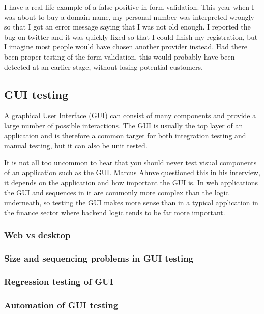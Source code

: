 \documentclass[11pt]{article}
\begin{document}
I have a real life example of a false positive in form validation. This year when I was about to buy a domain name, my personal number was interpreted wrongly so that I got an error message saying that I was not old enough. I reported the bug on twitter and it was quickly fixed so that I could finish my registration, but I imagine most people would have chosen another provider instead. Had there been proper testing of the form validation, this would probably have been detected at an earlier stage, without losing potential customers. \cite{TwitterMe}

\subsection{GUI testing}

A graphical User Interface (GUI) can consist of many components and provide a large number of possible interactions. The GUI is usually the top layer of an application and is therefore a common target for both integration testing and manual testing, but it can also be unit tested.

It is not all too uncommon to hear that you should never test visual components of an application such as the GUI. Marcus Ahnve questioned this in his interview, it depends on the application and how important the GUI is. In web applications the GUI and sequences in it are commonly more complex than the logic underneath, so testing the GUI makes more sense than in a typical application in the finance sector where backend logic tends to be far more important. \cite[question~21]{Ahnve}

\subsubsection{Web vs desktop}

\subsubsection{Size and sequencing problems in GUI testing}

\subsubsection{Regression testing of GUI}

\subsubsection{Automation of GUI testing}
\end{document}
